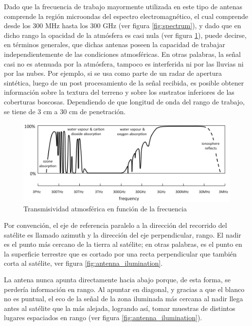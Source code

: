Dado que la frecuencia de trabajo mayormente utilizada en este tipo de antenas comprende la región microondas del espectro
electromagnético, el cual comprende desde los 300 MHz hasta los 300 GHz (ver figura \ref{fig:spectrum}), y dado que en dicho rango la 
opacidad de la atmósfera es casi nula (ver figura \ref{fig:atmosphere}), puede decirse, en términos generales, que dichas 
antenas poseen la capacidad de trabajar independientemente de las condiciones atmosféricas. En otras palabras, la señal casi no es 
atenuada por la atmósfera, tampoco es interferida ni por las lluvias ni por las nubes. Por ejemplo, si se usa como parte de un 
radar de apertura sintética, luego de un post procesamiento de la señal recibida, es posible obtener información sobre la 
textura del terreno y sobre los sustratos inferiores de las coberturas boscosas. Dependiendo de que longitud de onda del rango de
trabajo, se tiene de 3 cm a 30 cm de penetración.

\begin{figure}[H]
 \centering
 \includegraphics[width=12cm]{gfx/atmosphericOpacity.png}
 \caption{Transmisividad atmosférica en función de la frecuencia \cite{Richards2013}}
 \label{fig:atmosphere}
\end{figure}

Por convención, el eje de referencia paralelo a la dirección del recorrido del satélite es llamado azimuth y la
dirección del eje perpendicular, rango. El nadir es el punto más cercano de la tierra al satélite; en otras palabras,
es el punto en la superficie terrestre que es cortado por una recta perpendicular que también corta al satélite, ver figura
\ref{fig:antenna_ilumination}.

La antena nunca apunta directamente hacia abajo porque, de esta forma, se perdería información en rango. Al apuntar
en diagonal, y gracias a que el blanco no es puntual, el eco de la señal de la zona iluminada más cercana al nadir llega
antes al satélite que la más alejada, logrando así, tomar muestras de distintos lugares espaciados en rango (ver figura
\ref{fig:antenna_ilumination}).

